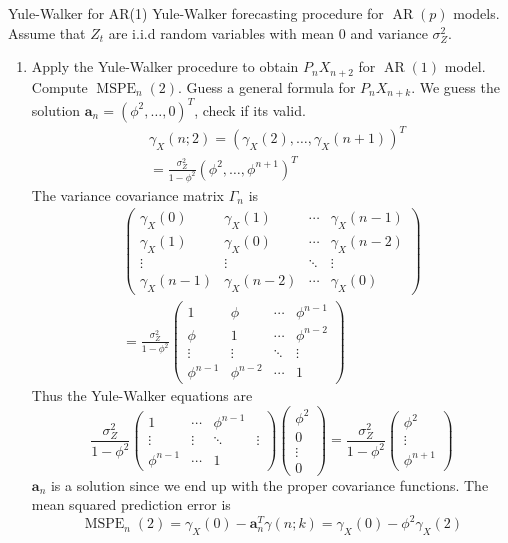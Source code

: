 \documentclass{article}
\DeclareMathOperator{\ar}{AR}
\DeclareMathOperator{\mspe}{MSPE}
\begin{document}
\begin{multicols*}{3}
    
\begin{blackbox}{Yule-Walker for AR(1)}
    Yule-Walker forecasting procedure for $\ar(p)$ models. Assume that $Z_t$ are i.i.d random variables with mean 0 and variance $\sigma_Z^2$.
\begin{enumerate}[label=\alph*),leftmargin=6pt]
    \item Apply the Yule-Walker procedure to obtain $P_nX_{n+2}$ for $\ar(1)$ model. Compute $\mspe_n(2)$. Guess a general formula for $P_nX_{n+k}$. We guess the solution $\textbf{a}_n = (\phi^2, \ldots, 0)^T$, check if its valid.
    \begin{align*}
        &\gamma_X(n;2) = (\gamma_X(2), \ldots, \gamma_X(n+1))^T\\
        &=\frac{\sigma_Z^2}{1-\phi^2}(\phi^2, \ldots, \phi^{n+1})^T
    \end{align*}
    The variance covariance matrix $\Gamma_n$ is 
    \begin{align*}
        \begin{pmatrix}
            \gamma_X(0) & \gamma_X(1) & \cdots & \gamma_X(n-1)\\
            \gamma_X(1) & \gamma_X(0) & \cdots & \gamma_X(n-2)\\
            \vdots & \vdots & \ddots & \vdots\\
            \gamma_X(n-1) & \gamma_X(n-2) & \cdots & \gamma_X(0)
        \end{pmatrix}\\ = \frac{\sigma_Z^2}{1-\phi^2}\begin{pmatrix}
            1 & \phi & \cdots & \phi^{n-1}\\
            \phi & 1 & \cdots & \phi^{n-2}\\
            \vdots & \vdots & \ddots & \vdots\\
            \phi^{n-1} & \phi^{n-2} & \cdots & 1
        \end{pmatrix}
    \end{align*}
    Thus the Yule-Walker equations are
    \[
        \frac{\sigma_Z^2}{1-\phi^2}\begin{pmatrix}
            1  & \cdots & \phi^{n-1}\\
            \vdots & \vdots & \ddots & \vdots\\
            \phi^{n-1}  & \cdots & 1
        \end{pmatrix}\begin{pmatrix}
            \phi^2\\ 0\\ \vdots\\ 0
        \end{pmatrix} = 
        \frac{\sigma_Z^2}{1-\phi^2}\begin{pmatrix}
            \phi^2\\ \vdots\\ \phi^{n+1}
        \end{pmatrix}
    \]
    $\textbf{a}_n$ is a solution since we end up with the proper covariance functions. The mean squared prediction error is
    \[
        \mspe_n(2) = \gamma_X(0) - \textbf{a}_n^T\gamma(n;k) = \gamma_X(0) - \phi^2\gamma_X(2)
    \]
    

\end{enumerate}
\end{blackbox}
\end{multicols*}
\end{document}
